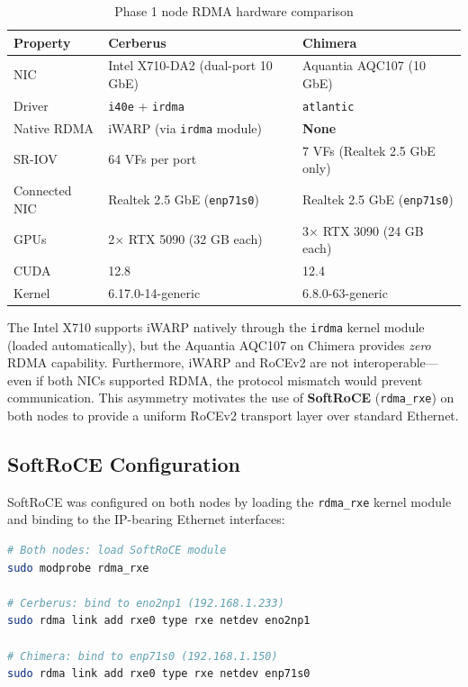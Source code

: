 \documentclass[11pt,letterpaper]{article}
\theoremstyle{definition}
\begin{document}
\begin{table}[htbp]
\centering
\caption{Phase 1 node RDMA hardware comparison}
\label{tab:rdma-hardware-comparison}
\begin{tabular}{@{}lll@{}}
\toprule
\textbf{Property} & \textbf{Cerberus} & \textbf{Chimera} \\
\midrule
NIC & Intel X710-DA2 (dual-port 10 GbE) & Aquantia AQC107 (10 GbE) \\
Driver & \texttt{i40e} + \texttt{irdma} & \texttt{atlantic} \\
Native RDMA & iWARP (via \texttt{irdma} module) & \textbf{None} \\
SR-IOV & 64 VFs per port & 7 VFs (Realtek 2.5 GbE only) \\
Connected NIC & Realtek 2.5 GbE (\texttt{enp71s0}) & Realtek 2.5 GbE (\texttt{enp71s0}) \\
GPUs & 2$\times$ RTX 5090 (32 GB each) & 3$\times$ RTX 3090 (24 GB each) \\
CUDA & 12.8 & 12.4 \\
Kernel & 6.17.0-14-generic & 6.8.0-63-generic \\
\bottomrule
\end{tabular}
\end{table}

The Intel X710 supports iWARP natively through the \texttt{irdma} kernel module (loaded automatically), but the Aquantia AQC107 on Chimera provides \emph{zero} RDMA capability. Furthermore, iWARP and RoCEv2 are not interoperable---even if both NICs supported RDMA, the protocol mismatch would prevent communication. This asymmetry motivates the use of \textbf{SoftRoCE} (\texttt{rdma\_rxe}) on both nodes to provide a uniform RoCEv2 transport layer over standard Ethernet.

\subsection{SoftRoCE Configuration}
\label{sec:test1-softroce-setup}

SoftRoCE was configured on both nodes by loading the \texttt{rdma\_rxe} kernel module and binding to the IP-bearing Ethernet interfaces:

\begin{lstlisting}[language=bash,caption={SoftRoCE setup on both nodes}]
# Both nodes: load SoftRoCE module
sudo modprobe rdma_rxe

# Cerberus: bind to eno2np1 (192.168.1.233)
sudo rdma link add rxe0 type rxe netdev eno2np1

# Chimera: bind to enp71s0 (192.168.1.150)
sudo rdma link add rxe0 type rxe netdev enp71s0
\end{lstlisting}
\end{document}
